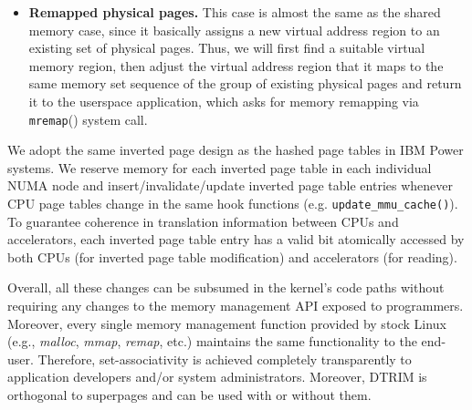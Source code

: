 \begin{itemize}
  \item \textbf{Remapped physical pages.} This case is almost the same as the shared memory case, 
  since it basically assigns a new virtual address region to an existing set of physical pages. 
  Thus, we will first find a suitable virtual memory region, then adjust the virtual address region
  that it maps to the same memory set sequence of the group of existing physical pages and return
  it to the userspace application, which asks for memory remapping via \verb|mremap|() system call.

\end{itemize}


\vspace{2mm}
 We adopt the same inverted
page design as the hashed page tables in IBM Power systems. We reserve
memory for each inverted page table in each individual NUMA node and
insert/invalidate/update inverted page table entries whenever CPU page
tables change in the same hook functions
(e.g. \verb|update_mmu_cache()|). To guarantee coherence in
translation information between CPUs and accelerators, each inverted
page table entry has a valid bit atomically accessed by both CPUs (for
inverted page table modification) and accelerators (for
reading). 

\vspace{2mm}{\noindent \bf Summary:} Overall, all these changes can be
subsumed in the kernel's code paths without requiring any changes to
the memory management API exposed to programmers. Moreover, every
single memory management function provided by stock Linux (e.g., {\it
  malloc}, {\it mmap}, {\it remap}, etc.) maintains the same
functionality to the end-user. Therefore, set-associativity is
achieved completely transparently to application developers and/or
system administrators. Moreover, DTRIM is orthogonal to superpages and
can be used with or without them.

